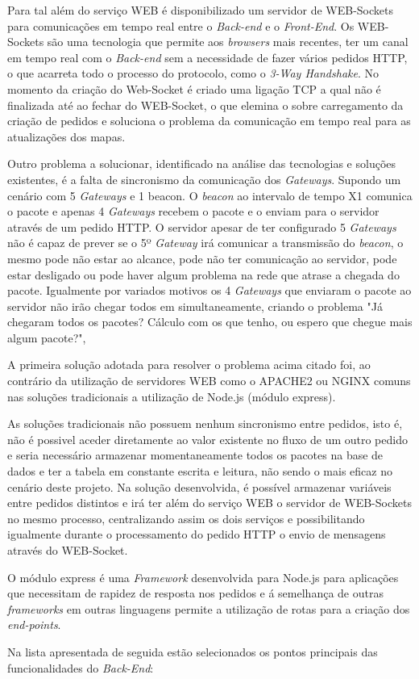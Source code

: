 \par Para tal além do serviço WEB é disponibilizado um servidor de WEB-Sockets para comunicações em tempo real entre o \textit{Back-end} e o \textit{Front-End}. Os WEB-Sockets são uma tecnologia que permite aos \textit{browsers} mais recentes, ter um canal em tempo real com o \textit{Back-end} sem a necessidade de fazer vários pedidos HTTP, o que acarreta todo o processo do protocolo, como o \textit{3-Way Handshake}. No momento da criação do Web-Socket é criado uma ligação TCP a qual não é finalizada até ao fechar do WEB-Socket, o que elemina o sobre carregamento da criação de pedidos e soluciona o problema da comunicação em tempo real para as atualizações dos mapas.

\par Outro problema a solucionar, identificado na análise das tecnologias e soluções existentes, é a falta de sincronismo da comunicação dos \textit{Gateways}. Supondo um cenário com 5 \textit{Gateways} e 1 beacon. O \textit{beacon} ao intervalo de tempo X1 comunica o pacote e apenas 4 \textit{Gateways} recebem o pacote e o enviam para o servidor através de um pedido HTTP. O servidor apesar de ter configurado 5 \textit{Gateways} não é capaz de prever se o 5º \textit{Gateway} irá comunicar a transmissão do \textit{beacon}, o mesmo pode não estar ao alcance, pode não ter comunicação ao servidor, pode estar desligado ou pode haver algum problema na rede que atrase a chegada do pacote. Igualmente por variados motivos os 4 \textit{Gateways} que enviaram o pacote ao servidor não irão chegar todos em simultaneamente, criando o problema "Já chegaram todos os pacotes? Cálculo com os que tenho, ou espero que chegue mais algum pacote?",

\par A primeira solução adotada para resolver o problema acima citado foi, ao contrário da utilização de servidores WEB como o APACHE2 ou NGINX comuns nas soluções tradicionais a utilização de Node.js (módulo express). 
\par As soluções tradicionais não possuem nenhum sincronismo entre pedidos, isto é, não é possivel aceder diretamente ao valor existente no fluxo de um outro pedido e seria necessário armazenar momentaneamente todos os pacotes na base de dados e ter a tabela em constante escrita e leitura, não sendo o mais eficaz no cenário deste projeto. Na solução desenvolvida, é possível armazenar variáveis entre pedidos distintos e irá ter além do serviço WEB o servidor de WEB-Sockets no mesmo processo, centralizando assim os dois serviços e possibilitando igualmente durante o processamento do pedido HTTP o envio de mensagens através do WEB-Socket. 
\par O módulo express é uma \textit{Framework} desenvolvida para Node.js para aplicações que necessitam de rapidez de resposta nos pedidos e á semelhança de outras \textit{frameworks} em outras linguagens permite a utilização de rotas para a criação dos \textit{end-points}.
\par Na lista apresentada de seguida estão selecionados os pontos principais das funcionalidades do \textit{Back-End}:

